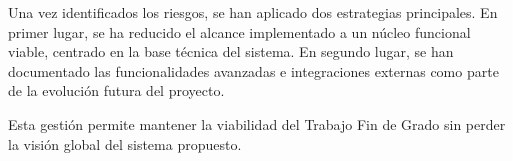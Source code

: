 Una vez identificados los riesgos, se han aplicado dos estrategias principales. En primer lugar, se ha reducido el alcance implementado a un núcleo funcional viable, centrado en la base técnica del sistema. En segundo lugar, se han documentado las funcionalidades avanzadas e integraciones externas como parte de la evolución futura del proyecto.

Esta gestión permite mantener la viabilidad del Trabajo Fin de Grado sin perder la visión global del sistema propuesto.
